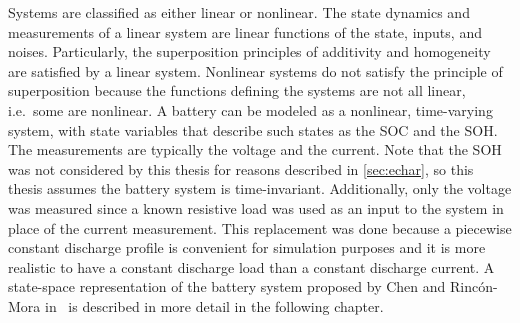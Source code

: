 \documentclass[../zhang_thesis.tex]{subfiles}
\begin{document}
Systems are classified as either linear or nonlinear. The state dynamics and measurements of a linear system are linear functions of the state, inputs, and noises. Particularly, the superposition principles of additivity and homogeneity are satisfied by a linear system. Nonlinear systems do not satisfy the principle of superposition because the functions defining the systems are not all linear, i.e.\ some are nonlinear. A battery can be modeled as a nonlinear, time-varying system,
with state variables that describe such states as the SOC and the SOH. The measurements are typically the voltage and the current. Note that the SOH was not considered by this thesis for reasons described in \cref{sec:echar}, so this thesis assumes the battery system is time-invariant. Additionally, only the voltage was measured since a known resistive load was used as an input to the system in place of the current measurement. This replacement was done because a piecewise constant discharge profile is convenient for simulation purposes and it is
more realistic to have a constant discharge load than a constant discharge current. A state-space representation of the battery system proposed by Chen and Rinc\'on-Mora in~\cite{chen06} is described in more detail in the following chapter.

\end{document}
